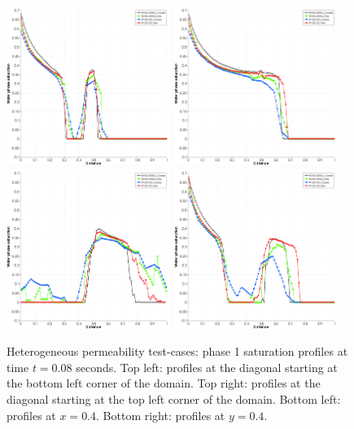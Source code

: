 \begin{figure}[h]
  \begin{center}
    \includegraphics[width=0.475\textwidth]{./diagrams/down_left_top_right083}
    \includegraphics[width=0.475\textwidth]{./diagrams/Top_left-Down_right083}
    \includegraphics[width=0.475\textwidth]{./diagrams/X04_083}
    \includegraphics[width=0.475\textwidth]{./diagrams/y04_083}
    \caption{Heterogeneous permeability test-cases: phase 1 saturation profiles at time $t=0.08$ seconds. Top left: profiles at the diagonal starting at the bottom left corner of the domain. Top right: profiles at the diagonal starting at the top left corner of the domain. Bottom left: profiles at $x=0.4$. Bottom right: profiles at $y=0.4$.\label{fig:4reg_plots}}
  \end{center}
\end{figure}



